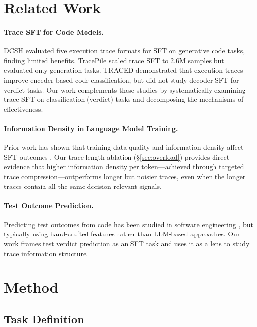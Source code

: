 \documentclass[11pt,a4paper]{article}
\begin{document}
\section{Related Work}
\label{sec:related}

\paragraph{Trace SFT for Code Models.}
DCSH \cite{ni2024next} evaluated five execution trace formats for SFT on generative code tasks, finding limited benefits.
TracePile \cite{shi2024tracepile} scaled trace SFT to 2.6M samples but evaluated only generation tasks.
TRACED \cite{jain2024traced} demonstrated that execution traces improve encoder-based code classification, but did not study decoder SFT for verdict tasks.
Our work complements these studies by systematically examining trace SFT on classification (verdict) tasks and decomposing the mechanisms of effectiveness.

\paragraph{Information Density in Language Model Training.}
Prior work has shown that training data quality and information density affect SFT outcomes \cite{zhou2024lima}.
Our trace length ablation (\S\ref{sec:overload}) provides direct evidence that higher information density per token---achieved through targeted trace compression---outperforms longer but noisier traces, even when the longer traces contain all the same decision-relevant signals.

\paragraph{Test Outcome Prediction.}
Predicting test outcomes from code has been studied in software engineering \cite{chen2022test}, but typically using hand-crafted features rather than LLM-based approaches.
Our work frames test verdict prediction as an SFT task and uses it as a lens to study trace information structure.

\section{Method}
\label{sec:method}

\subsection{Task Definition}
\end{document}
